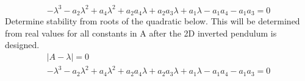 \documentclass[12pt]{article}
\begin{document}
			\begin{equation}
				-\lambda^3-a_2\lambda^2+a_4\lambda^2+a_2a_4\lambda+a_2a_3\lambda+a_1\lambda-a_1a_4-a_1a_3 = 0
			\end{equation}
			Determine stability from roots of the quadratic below. This will be determined from real values for all constants in A after the 2D inverted pendulum is designed.
			\begin{equation}
				\boxed{
				\begin{matrix}
					|A - \lambda| = 0 \\
					-\lambda^3-a_2\lambda^2+a_4\lambda^2+a_2a_4\lambda+a_2a_3\lambda+a_1\lambda-a_1a_4-a_1a_3 = 0
				\end{matrix}
				}	
			\end{equation}
\end{document}
